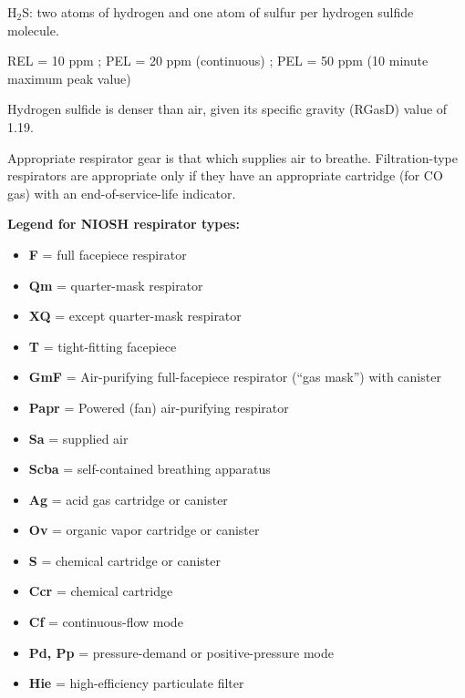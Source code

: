 












H$_{2}$S: two atoms of hydrogen and one atom of sulfur per hydrogen sulfide molecule.

\vskip 10pt

REL = 10 ppm ; PEL = 20 ppm (continuous) ; PEL = 50 ppm (10 minute maximum peak value)

\vskip 10pt

Hydrogen sulfide is denser than air, given its specific gravity (RGasD) value of 1.19.

\vskip 10pt

Appropriate respirator gear is that which supplies air to breathe.  Filtration-type respirators are appropriate only if they have an appropriate cartridge (for CO gas) with an end-of-service-life indicator.

\vskip 10pt

\noindent
{\bf Legend for NIOSH respirator types:}

\begin{itemize}
\item{} {\bf F} = full facepiece respirator
\item{} {\bf Qm} = quarter-mask respirator
\item{} {\bf XQ} = except quarter-mask respirator
\item{} {\bf T} = tight-fitting facepiece
\item{} {\bf GmF} = Air-purifying full-facepiece respirator (``gas mask'') with canister
\item{} {\bf Papr} = Powered (fan) air-purifying respirator
\item{} {\bf Sa} = supplied air
\item{} {\bf Scba} = self-contained breathing apparatus
\item{} {\bf Ag} = acid gas cartridge or canister
\item{} {\bf Ov} = organic vapor cartridge or canister
\item{} {\bf S} = chemical cartridge or canister
\item{} {\bf Ccr} = chemical cartridge
\item{} {\bf Cf} = continuous-flow mode
\item{} {\bf Pd, Pp} = pressure-demand or positive-pressure mode
\item{} {\bf Hie} = high-efficiency particulate filter
\end{itemize}













